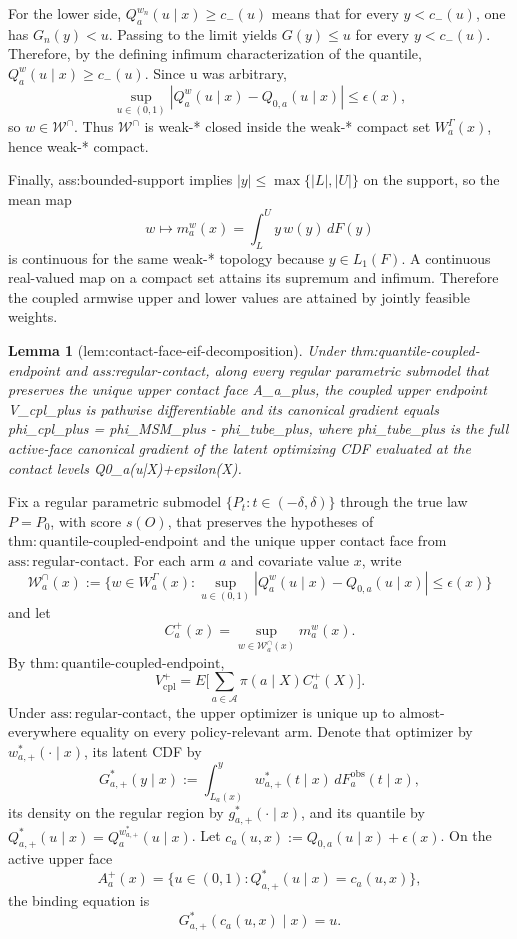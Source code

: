 \documentclass{article}
\newtheorem{lemma}{Lemma}
\begin{document}
For the lower side, \(Q_a^{w_n}(u\mid x)\ge c_-(u)\) means that for every \(y<c_-(u)\), one has \(G_n(y)<u\). Passing to the limit yields \(G(y)\le u\) for every \(y<c_-(u)\). Therefore, by the defining infimum characterization of the quantile, \(Q_a^w(u\mid x)\ge c_-(u)\). Since u was arbitrary,
\[
\sup_{u\in(0,1)} |Q_a^w(u\mid x)-Q_{0,a}(u\mid x)|\le \epsilon(x),
\]
so \(w\in\mathcal W^{\cap}\). Thus \(\mathcal W^{\cap}\) is weak-* closed inside the weak-* compact set \(W_a^{\Gamma}(x)\), hence weak-* compact.

Finally, ass:bounded-support implies \(|y|\le \max\{|L|,|U|\}\) on the support, so the mean map
\[
w\mapsto m_a^w(x)=\int_L^U y\,w(y)\,dF(y)
\]
is continuous for the same weak-* topology because \(y\in L_1(F)\). A continuous real-valued map on a compact set attains its supremum and infimum. Therefore the coupled armwise upper and lower values are attained by jointly feasible weights.

\begin{lemma}[lem:contact-face-eif-decomposition]\label{lem:contact-face-eif-decomposition}
Under thm:quantile-coupled-endpoint and ass:regular-contact, along every regular parametric submodel that preserves the unique upper contact face A_a_plus, the coupled upper endpoint V_cpl_plus is pathwise differentiable and its canonical gradient equals phi_cpl_plus = phi_MSM_plus - phi_tube_plus, where phi_tube_plus is the full active-face canonical gradient of the latent optimizing CDF evaluated at the contact levels Q0_a(u|X)+epsilon(X).
\end{lemma}
Fix a regular parametric submodel \(\{P_t:t\in(-\delta,\delta)\}\) through the true law \(P=P_0\), with score \(s(O)\), that preserves the hypotheses of \(\mathrm{thm\!:\!quantile\mbox{-}coupled\mbox{-}endpoint}\) and the unique upper contact face from \(\mathrm{ass\!:\!regular\mbox{-}contact}\). For each arm \(a\) and covariate value \(x\), write
\[
\mathcal W_a^{\cap}(x):=\Big\{w\in W_a^{\Gamma}(x):\sup_{u\in(0,1)}|Q_a^w(u\mid x)-Q_{0,a}(u\mid x)|\le \epsilon(x)\Big\}
\]
and let
\[
C_a^+(x)=\sup_{w\in\mathcal W_a^{\cap}(x)}m_a^w(x).
\]
By \(\mathrm{thm\!:\!quantile\mbox{-}coupled\mbox{-}endpoint}\),
\[
V_{\mathrm{cpl}}^+=E\Big[\sum_{a\in\mathcal A}\pi(a\mid X)C_a^+(X)\Big].
\]
Under \(\mathrm{ass\!:\!regular\mbox{-}contact}\), the upper optimizer is unique up to almost-everywhere equality on every policy-relevant arm. Denote that optimizer by \(w_{a,+}^*(\cdot\mid x)\), its latent CDF by
\[
G_{a,+}^*(y\mid x):=\int_{L_a(x)}^y w_{a,+}^*(t\mid x)\,dF_a^{\mathrm{obs}}(t\mid x),
\]
its density on the regular region by \(g_{a,+}^*(\cdot\mid x)\), and its quantile by \(Q_{a,+}^*(u\mid x)=Q_a^{w_{a,+}^*}(u\mid x)\). Let \(c_a(u,x):=Q_{0,a}(u\mid x)+\epsilon(x)\). On the active upper face
\[
A_a^+(x)=\{u\in(0,1):Q_{a,+}^*(u\mid x)=c_a(u,x)\},
\]
the binding equation is
\[
G_{a,+}^*(c_a(u,x)\mid x)=u.
\]
\end{document}
